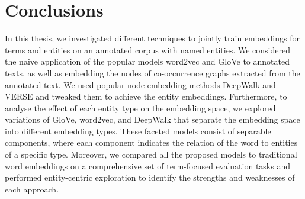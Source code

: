 \chapter{Conclusions}\label{chap:concl}

In this thesis, we investigated different techniques to jointly train embeddings for terms and entities on an annotated corpus with named entities. We considered the naive application of the popular models word2vec and GloVe to annotated texts, as well as embedding the nodes of co-occurrence graphs extracted from the annotated text. We used popular node embedding methods DeepWalk and VERSE and tweaked them to achieve the entity embeddings. Furthermore, to analyse the effect of each entity type on the embedding space, we explored variations of GloVe, word2vec, and DeepWalk that separate the embedding space into different embedding types. These faceted models consist of separable components, where each component indicates the relation of the word to entities of a specific type. Moreover, we compared all the proposed models to traditional word embeddings on a comprehensive set of term-focused evaluation tasks and performed entity-centric exploration to identify the strengths and weaknesses of each approach. 
